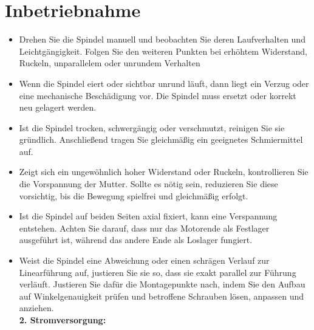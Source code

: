 \documentclass[a4paper,12pt]{report}
\begin{document}
	\section{Inbetriebnahme}
	\begin{itemize}[leftmargin=1.5em]
		Die Inbetriebnahme des Demonstrators erfolgt in mehreren definierten Schritten, um einen sicheren und zuverlässigen Betrieb zu gewährleisten. Besonders wichtig ist dabei die korrekte Spindelspannung, die Stromversorgung sowie die saubere Initialisierung der Steuerung. \\[0,75cm]
		
		\textbf{1. Spindel prüfen:}
		
		\item Drehen Sie die Spindel manuell und beobachten Sie deren Laufverhalten und Leichtgängigkeit. Folgen Sie den weiteren Punkten bei erhöhtem Widerstand, Ruckeln, unparallelem oder unrundem Verhalten 
		
		\item Wenn die Spindel eiert oder sichtbar unrund läuft, dann liegt ein Verzug oder eine mechanische Beschädigung vor. Die Spindel muss ersetzt oder korrekt neu gelagert werden.
		
		\item Ist die Spindel trocken, schwergängig oder verschmutzt, reinigen Sie sie gründlich. Anschließend tragen Sie gleichmäßig ein geeignetes Schmiermittel auf. 
		
		\item Zeigt sich ein ungewöhnlich hoher Widerstand oder Ruckeln, kontrollieren Sie die Vorspannung der Mutter. Sollte es nötig sein, reduzieren Sie diese vorsichtig, bis die Bewegung spielfrei und gleichmäßig erfolgt. 
		
		\item Ist die Spindel auf beiden Seiten axial fixiert, kann eine Verspannung entstehen. Achten Sie darauf, dass nur das Motorende als Festlager ausgeführt ist, während das andere Ende als Loslager fungiert.
		
		\item Weist die Spindel eine Abweichung oder einen schrägen Verlauf zur Linearführung auf, justieren Sie sie so, dass sie exakt parallel zur Führung verläuft. Justieren Sie dafür die Montagepunkte nach, indem Sie den Aufbau auf Winkelgenauigkeit prüfen und betroffene Schrauben lösen, anpassen und anziehen.\\ 
		
		
		\textbf{2. Stromversorgung:}
		

\end{itemize}
\end{document}
